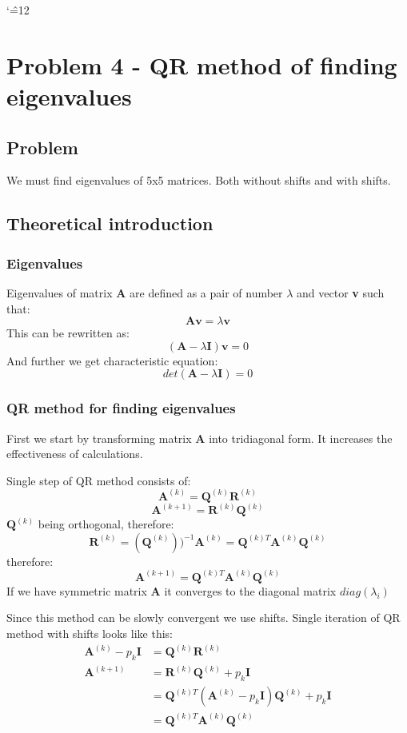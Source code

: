 \documentclass[12pt]{report}
\newenvironment{simplechar}{%
   \catcode`\^=12
}{}
\begin{document}
\begin{simplechar}
\chapter{Problem 4 - QR method of finding eigenvalues}

\section{Problem}
We must find eigenvalues of 5x5 matrices. Both without shifts and with shifts.
\section{Theoretical introduction}
\subsection{Eigenvalues}
Eigenvalues of matrix \textbf{A} are defined as a pair of number $\lambda$ and vector \textbf{v} such that:
\[ \mathbf{A}\mathbf{v} = \lambda\mathbf{v} \]
This can be rewritten as:
\[ (\mathbf{A} - \lambda\mathbf{I})\mathbf{v} = 0 \]
And further we get characteristic equation:
\[ det(\mathbf{A} - \lambda\mathbf{I}) = 0 \]

\newpage
\subsection{QR method for finding eigenvalues}
First we start by transforming matrix \textbf{A} into tridiagonal form. It increases the effectiveness of calculations.

Single step of QR method consists of:
\[ \textbf{A}^{(k)} = \textbf{Q}^{(k)}\textbf{R}^{(k)} \]
\[ \textbf{A}^{(k+1)} = \textbf{R}^{(k)}\textbf{Q}^{(k)} \]
$\textbf{Q}^{(k)}$ being orthogonal, therefore:
\[ \textbf{R}^{(k)} = (\textbf{Q}^{(k)}))^{-1}\textbf{A}^{(k)} = \textbf{Q}^{(k)T}\textbf{A}^{(k)}\textbf{Q}^{(k)} \]
therefore:
\[ \textbf{A}^{(k+1)} = \textbf{Q}^{(k)T}\textbf{A}^{(k)}\textbf{Q}^{(k)} \]
If we have symmetric matrix \textbf{A} it converges to the diagonal matrix $diag(\lambda_i)$

Since this method can be slowly convergent we use shifts. Single iteration of QR method with shifts looks like this:
\begin{equation}
\begin{split}
\textbf{A}^{(k)} - p_k\textbf{I} &= \textbf{Q}^{(k)}\textbf{R}^{(k)} \\
\textbf{A}^{(k+1)} &= \textbf{R}^{(k)}\textbf{Q}^{(k)} + p_k\textbf{I} \\
&= \textbf{Q}^{(k)T}(\textbf{A}^{(k)} - p_k\textbf{I})\textbf{Q}^{(k)} + p_k\textbf{I} \\
&=\textbf{Q}^{(k)T}\textbf{A}^{(k)}\textbf{Q}^{(k)} \\
\end{split}
\end{equation}


\end{simplechar}
\end{document}
